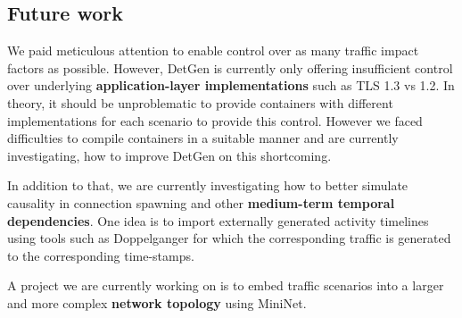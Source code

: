 \documentclass[runningheads]{llncs}
\begin{document}
\subsection{Future work}






We paid meticulous attention to enable control over as many traffic impact factors as possible. However, DetGen is currently only offering insufficient control over underlying \textbf{application-layer implementations} such as TLS 1.3 vs 1.2. In theory, it should be unproblematic to provide containers with different implementations for each scenario to provide this control. However we faced difficulties to compile containers in a suitable manner and are currently investigating, how to improve DetGen on this shortcoming.

In addition to that, we are currently investigating how to better simulate causality in connection spawning and other \textbf{medium-term temporal dependencies}. One idea is to import externally generated activity timelines using tools such as Doppelganger \cite{lin2019generating} for which the corresponding traffic is generated to the corresponding time-stamps. 

A project we are currently working on is to embed traffic scenarios into a larger and more complex \textbf{network topology} using MiniNet.


\end{document}
